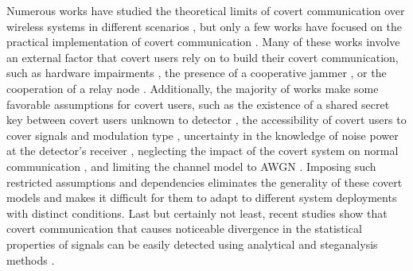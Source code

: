 Numerous works have studied the theoretical limits of covert communication over wireless systems in different scenarios \cite{bash2012square, soltani2018covert, sheikholeslami2018multi, li2021fundamental}, but only a few works have focused on the practical implementation of covert communication \cite{dutta2012secret, cao2018wireless, liao2020generative, mohammed2021adversarial}. Many of these works involve an external factor that covert users rely on to build their covert communication, such as hardware impairments \cite{mohammed2021adversarial}, the presence of a cooperative jammer \cite{sobers2017covert}, or the cooperation of a relay node \cite{liao2020generative, kim2022covert}. Additionally, the majority of works make some favorable assumptions for covert users, such as the existence of a shared secret key between covert users unknown to detector \cite{soltani2018covert}, the accessibility of covert users to cover signals and modulation type \cite{grzesiak2021wireless}, uncertainty in the knowledge of noise power at the detector's receiver \cite{he2017covert}, neglecting the impact of the covert system on normal communication \cite{mohammed2021adversarial}, and limiting the channel model to AWGN \cite{mohammed2021adversarial}. Imposing such restricted assumptions and dependencies eliminates the generality of these covert models and makes it difficult for them to adapt to different system deployments with distinct conditions. Last but certainly not least, recent studies show that covert communication that causes noticeable divergence in the statistical properties of signals can be easily detected using analytical and steganalysis methods \cite{bahramali2021robust,huang2020exploiting}.

